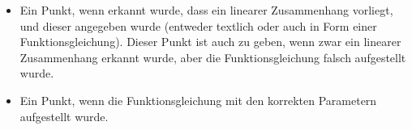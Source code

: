\begin{langesbeispiel}
{\begin{enumerate}
\begin{itemize}
	\item Ein Punkt, wenn erkannt wurde, dass ein linearer Zusammenhang vorliegt, und dieser angegeben wurde (entweder textlich oder auch in Form einer Funktionsgleichung). Dieser Punkt ist auch zu geben, wenn zwar ein linearer Zusammenhang erkannt wurde, aber die Funktionsgleichung falsch aufgestellt wurde.
	\item Ein Punkt, wenn die Funktionsgleichung mit den korrekten Parametern aufgestellt wurde.
\end{itemize}
\end{enumerate}}
		\end{langesbeispiel}